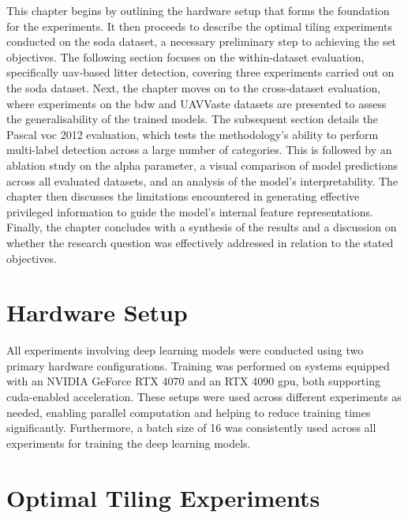 This chapter begins by outlining the hardware setup that forms the foundation for the experiments. It then proceeds to describe the optimal tiling experiments conducted on the \gls{soda} dataset, a necessary preliminary step to achieving the set objectives. The following section focuses on the within-dataset evaluation, specifically \gls{uav}-based litter detection, covering three experiments carried out on the \gls{soda} dataset. Next, the chapter moves on to the cross-dataset evaluation, where experiments on the \gls{bdw} and UAVVaste datasets are presented to assess the generalisability of the trained models. The subsequent section details the Pascal \gls{voc} 2012 evaluation, which tests the methodology's ability to perform multi-label detection across a large number of categories. This is followed by an ablation study on the alpha parameter, a visual comparison of model predictions across all evaluated datasets, and an analysis of the model's interpretability. The chapter then discusses the limitations encountered in generating effective privileged information to guide the model’s internal feature representations. Finally, the chapter concludes with a synthesis of the results and a discussion on whether the research question was effectively addressed in relation to the stated objectives.

\section{Hardware Setup}
\label{sec:5_hardware_setup}

All experiments involving deep learning models were conducted using two primary hardware configurations. Training was performed on systems equipped with an NVIDIA GeForce RTX 4070 and an RTX 4090 \gls{gpu}, both supporting \gls{cuda}-enabled acceleration. These setups were used across different experiments as needed, enabling parallel computation and helping to reduce training times significantly. Furthermore, a batch size of 16 was consistently used across all experiments for training the deep learning models.


\section{Optimal Tiling Experiments}
\label{sec:5_tiling_exp}

